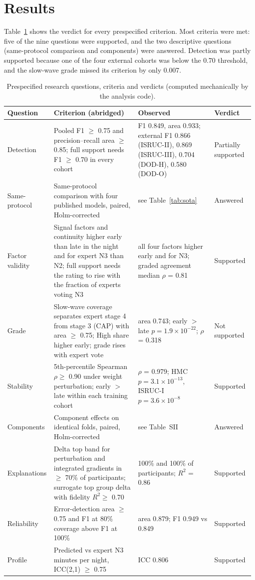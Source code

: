 \section{Results}
Table~\ref{tab:rq} shows the verdict for every prespecified criterion. Most criteria were met: five of the nine questions were supported, and the two descriptive questions (same-protocol comparison and components) were answered. Detection was partly supported because one of the four external cohorts was below the 0.70 threshold, and the slow-wave grade missed its criterion by only 0.007.

\begin{table}[!t]
\caption{Prespecified research questions, criteria and verdicts (computed mechanically by the analysis code).}
\label{tab:rq}
\centering
\scriptsize
\begin{tabular}{@{}p{1.75cm}p{7.1cm}p{6.9cm}p{1.7cm}@{}}
\toprule
Question & Criterion (abridged) & Observed & Verdict \\
\midrule
Detection & Pooled F1 $\geq$ 0.75 and precision--recall area $\geq$ 0.85; full support needs F1 $\geq$ 0.70 in every cohort & F1 0.849, area 0.933; external F1 0.866 (ISRUC-II), 0.869 (ISRUC-III), 0.704 (DOD-H), 0.580 (DOD-O) & Partially supported \\ %
Same-protocol & Same-protocol comparison with four published models, paired, Holm-corrected & see Table~\ref{tab:sota} & Answered \\
Factor validity & Signal factors and continuity higher early than late in the night and for expert N3 than N2; full support needs the rating to rise with the fraction of experts voting N3 & all four factors higher early and for N3; graded agreement median $\rho$ = 0.81 & Supported \\
Grade & Slow-wave coverage separates expert stage 4 from stage 3 (CAP) with area $\geq$ 0.75; High share higher early; grade rises with expert vote & area 0.743; early $>$ late $p = 1.9\times10^{-22}$; $\rho$ = 0.318 & Not supported \\
Stability & 5th-percentile Spearman $\rho \geq$ 0.90 under weight perturbation; early $>$ late within each training cohort & $\rho$ = 0.979; HMC $p = 3.1\times10^{-13}$, ISRUC-I $p = 3.6\times10^{-8}$ & Supported \\
Components & Component effects on identical folds, paired, Holm-corrected & see Table~SII & Answered \\
Explanations & Delta top band for perturbation and integrated gradients in $\geq$ 70\% of participants; surrogate top group delta with fidelity $R^2 \geq$ 0.70 & 100\% and 100\% of participants; $R^2$ = 0.86 & Supported \\
Reliability & Error-detection area $\geq$ 0.75 and F1 at 80\% coverage above F1 at 100\% & area 0.879; F1 0.949 vs 0.849 & Supported \\
Profile & Predicted vs expert N3 minutes per night, ICC(2,1) $\geq$ 0.75 & ICC 0.806 & Supported \\
\bottomrule
\end{tabular}
\end{table}

